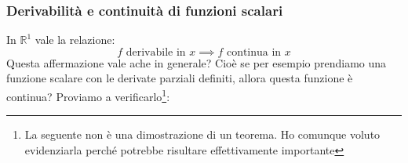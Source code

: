 \subsubsection{Derivabilità e continuità di funzioni scalari}
In $\mathbb{R}^1$ vale la relazione:
\begin{equation*}
	f \text{ derivabile in } x \implies f \text{ continua in } x
\end{equation*}
Questa affermazione vale ache in generale? Cioè se per esempio prendiamo una 
funzione scalare con le derivate parziali definiti, allora questa funzione è 
continua? Proviamo a verificarlo\footnote{La seguente non è una dimostrazione 
di un teorema. Ho comunque voluto evidenziarla perché potrebbe risultare 
effettivamente importante}:

